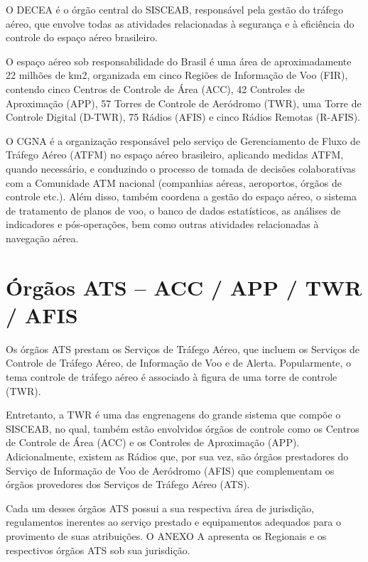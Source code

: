 \documentclass[
]{book}
\begin{document}
O DECEA é o órgão central do SISCEAB, responsável pela gestão do tráfego aéreo, que envolve todas as atividades relacionadas à segurança e à eficiência do controle do espaço aéreo brasileiro.

O espaço aéreo sob responsabilidade do Brasil é uma área de aproximadamente 22 milhões de km2, organizada em cinco Regiões de Informação de Voo (FIR), contendo cinco Centros de Controle de Área (ACC), 42 Controles de Aproximação (APP), 57 Torres de Controle de Aeródromo (TWR), uma Torre de Controle Digital (D-TWR), 75 Rádios (AFIS) e cinco Rádios Remotas (R-AFIS).

O CGNA é a organização responsável pelo serviço de Gerenciamento de Fluxo de Tráfego Aéreo (ATFM) no espaço aéreo brasileiro, aplicando medidas ATFM, quando necessário, e conduzindo o processo de tomada de decisões colaborativas com a Comunidade ATM nacional (companhias aéreas, aeroportos, órgãos de controle etc.). Além disso, também coordena a gestão do espaço aéreo, o sistema de tratamento de planos de voo, o banco de dados estatísticos, as análises de indicadores e pós-operações, bem como outras atividades relacionadas à navegação aérea.

\hypertarget{uxf3rguxe3os-ats-acc-app-twr-afis}{%
\section{Órgãos ATS -- ACC / APP / TWR / AFIS}\label{uxf3rguxe3os-ats-acc-app-twr-afis}}

Os órgãos ATS prestam os Serviços de Tráfego Aéreo, que incluem os Serviços de Controle de Tráfego Aéreo, de Informação de Voo e de Alerta. Popularmente, o tema controle de tráfego aéreo é associado à figura de uma torre de controle (TWR).

Entretanto, a TWR é uma das engrenagens do grande sistema que compõe o SISCEAB, no qual, também estão envolvidos órgãos de controle como os Centros de Controle de Área (ACC) e os Controles de Aproximação (APP). Adicionalmente, existem as Rádios que, por sua vez, são órgãos prestadores do Serviço de Informação de Voo de Aeródromo (AFIS) que complementam os órgãos provedores dos Serviços de Tráfego Aéreo (ATS).

Cada um desses órgãos ATS possui a sua respectiva área de jurisdição, regulamentos inerentes ao serviço prestado e equipamentos adequados para o provimento de suas atribuições. O ANEXO A apresenta os Regionais e os respectivos órgãos ATS sob sua jurisdição.
\end{document}
